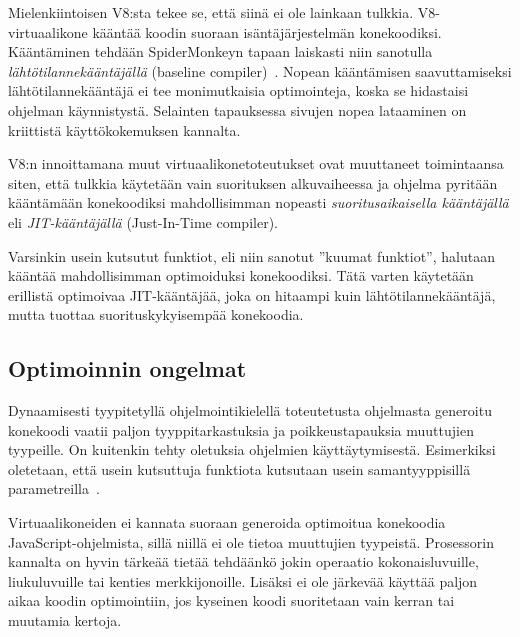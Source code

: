 Mielenkiintoisen V8:sta tekee se, että siinä ei ole lainkaan tulkkia. V8-virtuaalikone kääntää koodin suoraan isäntäjärjestelmän konekoodiksi. Kääntäminen tehdään SpiderMonkeyn tapaan laiskasti niin sanotulla \textit{lähtötilannekääntäjällä} (baseline compiler)~\cite{v8design}. Nopean kääntämisen saavuttamiseksi lähtötilannekääntäjä ei tee monimutkaisia optimointeja, koska se hidastaisi ohjelman käynnistystä. Selainten tapauksessa sivujen nopea lataaminen on kriittistä käyttökokemuksen kannalta.

V8:n innoittamana muut virtuaalikonetoteutukset ovat muuttaneet toimintaansa siten, että tulkkia käytetään vain suorituksen alkuvaiheessa ja ohjelma pyritään kääntämään konekoodiksi mahdollisimman nopeasti \textit{suoritusaikaisella kääntäjällä} eli \textit{JIT-kääntäjällä} (Just-In-Time compiler).

Varsinkin usein kutsutut funktiot, eli niin sanotut ''kuumat funktiot'', halutaan kääntää mahdollisimman optimoiduksi konekoodiksi. Tätä varten käytetään erillistä optimoivaa JIT-kääntäjää, joka on hitaampi kuin lähtötilannekääntäjä, mutta tuottaa suorituskykyisempää konekoodia.



\subsection{Optimoinnin ongelmat}

Dynaamisesti tyypitetyllä ohjelmointikielellä toteutetusta ohjelmasta generoitu konekoodi vaatii paljon tyyppitarkastuksia ja poikkeustapauksia muuttujien tyypeille. On kuitenkin tehty oletuksia ohjelmien käyttäytymisestä. Esimerkiksi oletetaan, että usein kutsuttuja funktiota kutsutaan usein samantyyppisillä parametreilla~\cite[s.~2]{jsanalysis}.

Virtuaalikoneiden ei kannata suoraan generoida optimoitua konekoodia JavaScript-ohjelmista, sillä niillä ei ole tietoa muuttujien tyypeistä. Prosessorin kannalta on hyvin tärkeää tietää tehdäänkö jokin operaatio kokonaisluvuille, liukuluvuille tai kenties merkkijonoille. Lisäksi ei ole järkevää käyttää paljon aikaa koodin optimointiin, jos kyseinen koodi suoritetaan vain kerran tai muutamia kertoja.

